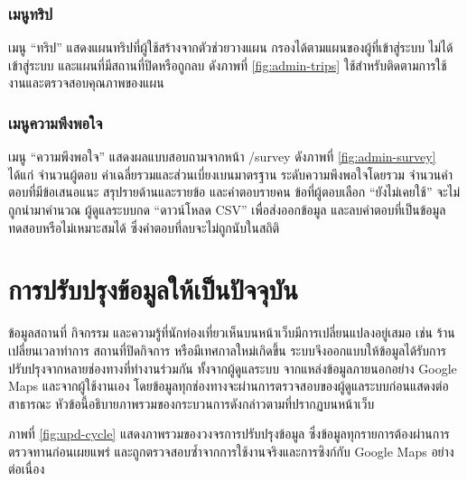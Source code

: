 
\subsubsection{เมนูทริป}

เมนู ``ทริป'' แสดงแผนทริปที่ผู้ใช้สร้างจากตัวช่วยวางแผน กรองได้ตามแผนของผู้ที่เข้าสู่ระบบ ไม่ได้เข้าสู่ระบบ และแผนที่มีสถานที่ปิดหรือถูกลบ ดังภาพที่ \ref{fig:admin-trips} ใช้สำหรับติดตามการใช้งานและตรวจสอบคุณภาพของแผน


\subsubsection{เมนูความพึงพอใจ}

เมนู ``ความพึงพอใจ'' แสดงผลแบบสอบถามจากหน้า /survey ดังภาพที่ \ref{fig:admin-survey} ได้แก่ จำนวนผู้ตอบ ค่าเฉลี่ยรวมและส่วนเบี่ยงเบนมาตรฐาน ระดับความพึงพอใจโดยรวม จำนวนคำตอบที่มีข้อเสนอแนะ สรุปรายด้านและรายข้อ และคำตอบรายคน ข้อที่ผู้ตอบเลือก ``ยังไม่เคยใช้'' จะไม่ถูกนำมาคำนวณ ผู้ดูแลระบบกด ``ดาวน์โหลด CSV'' เพื่อส่งออกข้อมูล และลบคำตอบที่เป็นข้อมูลทดสอบหรือไม่เหมาะสมได้ ซึ่งคำตอบที่ลบจะไม่ถูกนับในสถิติ


\section{การปรับปรุงข้อมูลให้เป็นปัจจุบัน}

ข้อมูลสถานที่ กิจกรรม และความรู้ที่นักท่องเที่ยวเห็นบนหน้าเว็บมีการเปลี่ยนแปลงอยู่เสมอ เช่น ร้านเปลี่ยนเวลาทำการ สถานที่ปิดกิจการ หรือมีเทศกาลใหม่เกิดขึ้น ระบบจึงออกแบบให้ข้อมูลได้รับการปรับปรุงจากหลายช่องทางที่ทำงานร่วมกัน ทั้งจากผู้ดูแลระบบ จากแหล่งข้อมูลภายนอกอย่าง Google Maps และจากผู้ใช้งานเอง โดยข้อมูลทุกช่องทางจะผ่านการตรวจสอบของผู้ดูแลระบบก่อนแสดงต่อสาธารณะ หัวข้อนี้อธิบายภาพรวมของกระบวนการดังกล่าวตามที่ปรากฏบนหน้าเว็บ

ภาพที่ \ref{fig:upd-cycle} แสดงภาพรวมของวงจรการปรับปรุงข้อมูล ซึ่งข้อมูลทุกรายการต้องผ่านการตรวจทานก่อนเผยแพร่ และถูกตรวจสอบซ้ำจากการใช้งานจริงและการซิงก์กับ Google Maps อย่างต่อเนื่อง

